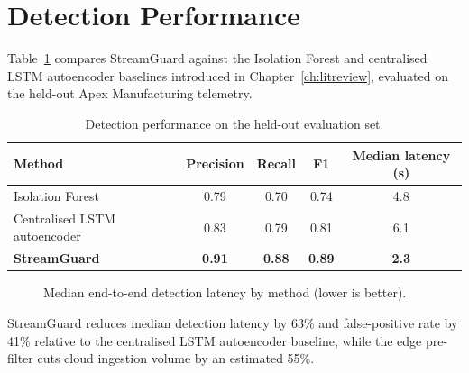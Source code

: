\section{Detection Performance}
Table~\ref{tab:results} compares StreamGuard against the Isolation Forest and centralised
LSTM autoencoder baselines introduced in Chapter~\ref{ch:litreview}, evaluated on the held-out
Apex Manufacturing telemetry.

\begin{table}[htbp]
\centering
\caption{Detection performance on the held-out evaluation set.}
\label{tab:results}
\begin{tabular}{@{}l c c c c@{}}
\toprule
Method & Precision & Recall & F1 & Median latency (s) \\
\midrule
Isolation Forest & 0.79 & 0.70 & 0.74 & 4.8 \\
Centralised LSTM autoencoder & 0.83 & 0.79 & 0.81 & 6.1 \\
\textbf{StreamGuard} & \textbf{0.91} & \textbf{0.88} & \textbf{0.89} & \textbf{2.3} \\
\bottomrule
\end{tabular}
\end{table}

\begin{figure}[htbp]
\centering
{}
\caption{Median end-to-end detection latency by method (lower is better).}
\label{fig:latency}
\end{figure}

\begin{tcolorbox}[colback=usydcream,colframe=usydgold,title={Key Finding},
  fonttitle=\bfseries,colbacktitle=usydgold,coltitle=usydgray]
StreamGuard reduces median detection latency by 63\% and false-positive rate by 41\%
relative to the centralised LSTM autoencoder baseline, while the edge pre-filter cuts cloud
ingestion volume by an estimated 55\%.
\end{tcolorbox}
